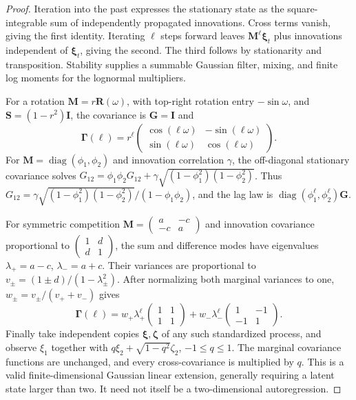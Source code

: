 \begin{proof}
Iteration into the past expresses the stationary state as the square-integrable sum of independently propagated innovations. Cross terms vanish, giving the first identity. Iterating \(\ell\) steps forward leaves \(\mathbf M^\ell\boldsymbol\xi_t\) plus innovations independent of \(\boldsymbol\xi_t\), giving the second. The third follows by stationarity and transposition. Stability supplies a summable Gaussian filter, mixing, and finite log moments for the lognormal multipliers.

For a rotation \(\mathbf M=r\mathbf R(\omega)\), with top-right rotation entry \(-\sin\omega\), and \(\mathbf S=(1-r^2)\mathbf I\), the covariance is \(\mathbf G=\mathbf I\) and
\[
 \boldsymbol\Gamma(\ell)=r^\ell
 \begin{pmatrix}\cos(\ell\omega)&-\sin(\ell\omega)\\
 \sin(\ell\omega)&\cos(\ell\omega)\end{pmatrix}.
\]
For \(\mathbf M=\operatorname{diag}(\phi_1,\phi_2)\) and innovation correlation \(\gamma\), the off-diagonal stationary covariance solves
\(G_{12}=\phi_1\phi_2G_{12}+\gamma\sqrt{(1-\phi_1^2)(1-\phi_2^2)}\).
Thus \(G_{12}=\gamma\sqrt{(1-\phi_1^2)(1-\phi_2^2)}/(1-\phi_1\phi_2)\), and the lag law is \(\operatorname{diag}(\phi_1^\ell,\phi_2^\ell)\mathbf G\).

For symmetric competition \(\mathbf M=\begin{pmatrix}a&-c\\-c&a\end{pmatrix}\) and innovation covariance proportional to \(\begin{pmatrix}1&d\\d&1\end{pmatrix}\), the sum and difference modes have eigenvalues \(\lambda_+=a-c\), \(\lambda_-=a+c\). Their variances are proportional to \(v_\pm=(1\pm d)/(1-\lambda_\pm^2)\). After normalizing both marginal variances to one, \(w_\pm=v_\pm/(v_++v_-)\) gives
\[
 \boldsymbol\Gamma(\ell)=w_+\lambda_+^\ell
 \begin{pmatrix}1&1\\1&1\end{pmatrix}
 +w_-\lambda_-^\ell\begin{pmatrix}1&-1\\-1&1\end{pmatrix}.
\]
Finally take independent copies \(\boldsymbol\xi,\boldsymbol\zeta\) of any such standardized process, and observe \(\xi_1\) together with \(q\xi_2+\sqrt{1-q^2}\zeta_2\), \(-1\leq q\leq1\). The marginal covariance functions are unchanged, and every cross-covariance is multiplied by \(q\). This is a valid finite-dimensional Gaussian linear extension, generally requiring a latent state larger than two. It need not itself be a two-dimensional autoregression.
\end{proof}


